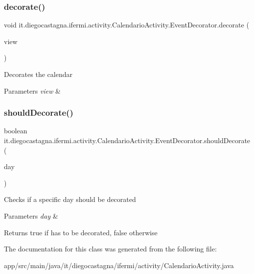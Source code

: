 \subsubsection{\texorpdfstring{decorate()}{decorate()}}
{\footnotesize\ttfamily void it.\+diegocastagna.\+ifermi.\+activity.\+Calendario\+Activity.\+Event\+Decorator.\+decorate (\begin{DoxyParamCaption}\item[{Day\+View\+Facade}]{view }\end{DoxyParamCaption})\hspace{0.3cm}{\ttfamily [inline]}}

Decorates the calendar 
\begin{DoxyParams}{Parameters}
{\em view} & \\
\hline
\end{DoxyParams}
\mbox{\label{classit_1_1diegocastagna_1_1ifermi_1_1activity_1_1_calendario_activity_1_1_event_decorator_a25fb467eecedbc798df6c9c62d73603c}} 
\subsubsection{\texorpdfstring{shouldDecorate()}{shouldDecorate()}}
{\footnotesize\ttfamily boolean it.\+diegocastagna.\+ifermi.\+activity.\+Calendario\+Activity.\+Event\+Decorator.\+should\+Decorate (\begin{DoxyParamCaption}\item[{Calendar\+Day}]{day }\end{DoxyParamCaption})\hspace{0.3cm}{\ttfamily [inline]}}

Checks if a specific day should be decorated 
\begin{DoxyParams}{Parameters}
{\em day} & \\
\hline
\end{DoxyParams}
\begin{DoxyReturn}{Returns}
true if has to be decorated, false otherwise 
\end{DoxyReturn}


The documentation for this class was generated from the following file\+:\begin{DoxyCompactItemize}
\item 
app/src/main/java/it/diegocastagna/ifermi/activity/Calendario\+Activity.\+java\end{DoxyCompactItemize}
